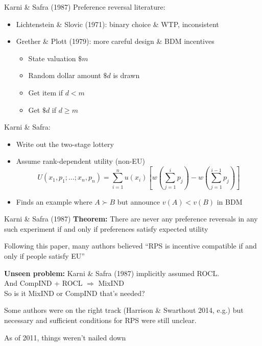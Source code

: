 \begin{frame}{Karni \& Safra (1987)}
Preference reversal literature:
\begin{itemize}
    \item Lichtenstein \& Slovic (1971): binary choice \& WTP, inconsistent
    \item Grether \& Plott (1979): more careful design \& BDM incentives
    \begin{itemize}
        \item State valuation $\$m$
        \item Random dollar amount $\$d$ is drawn
        \item Get item if $d<m$
        \item Get $\$d$ if $d\geq m$
    \end{itemize}
\end{itemize}

Karni \& Safra:
\begin{itemize}
    \item Write out the two-stage lottery
    \item Assume rank-dependent utility (non-EU)
    $$
    U(x_1,p_1;\ldots;x_n,p_n) = \sum_{i=1}^n u(x_i) \left[ w(\sum_{j=1}^i p_j) - w(\sum_{j=1}^{i-1} p_j)\right]
    $$
    \item Finds an example where $A\succ B$ but announce $v(A)<v(B)$ in BDM
\end{itemize}
\end{frame}

\begin{frame}{Karni \& Safra (1987)}
    \textbf{Theorem:} There are never any preference reversals in any such experiment if and only if preferences satisfy expected utility

    \br

    Following this paper, many authors believed ``RPS is incentive compatible if and only if people satisfy EU''

    \br

    \textbf{Unseen problem:} Karni \& Safra (1987) implicitly assumed ROCL.\\And CompIND + ROCL $\Rightarrow$ MixIND\\
    So is it MixIND or CompIND that's needed?

    \br

    Some authors were on the right track (Harrison \& Swarthout 2014, e.g.) but necessary and sufficient conditions for RPS were still unclear.

    \br

    As of 2011, things weren't nailed down
\end{frame}

